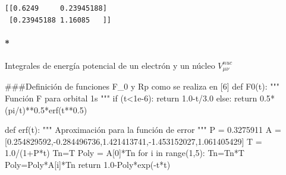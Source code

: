 \documentclass[
  letterpaper,
  DIV=11,
  numbers=noendperiod]{scrreprt}
\let\oldparagraph\paragraph
\renewcommand{\paragraph}[1]{\oldparagraph{#1}\mbox{}}
\newenvironment{Shaded}{\begin{snugshade}}{\end{snugshade}}
\newcommand{\BuiltInTok}[1]{\textcolor[rgb]{0.00,0.23,0.31}{#1}}
\newcommand{\CommentTok}[1]{\textcolor[rgb]{0.37,0.37,0.37}{#1}}
\newcommand{\ControlFlowTok}[1]{\textcolor[rgb]{0.00,0.23,0.31}{#1}}
\newcommand{\DecValTok}[1]{\textcolor[rgb]{0.68,0.00,0.00}{#1}}
\newcommand{\FloatTok}[1]{\textcolor[rgb]{0.68,0.00,0.00}{#1}}
\newcommand{\KeywordTok}[1]{\textcolor[rgb]{0.00,0.23,0.31}{#1}}
\newcommand{\NormalTok}[1]{\textcolor[rgb]{0.00,0.23,0.31}{#1}}
\newcommand{\OperatorTok}[1]{\textcolor[rgb]{0.37,0.37,0.37}{#1}}
\begin{document}
\begin{verbatim}
[[0.6249     0.23945188]
 [0.23945188 1.16085   ]]
\end{verbatim}

\hypertarget{integrales-de-energuxeda-potencial-de-un-electruxf3n-y-un-nuxfacleo-vnuc_mu-nu}{%
\paragraph*{\texorpdfstring{Integrales de energía potencial de un
electrón y un núcleo
\(V^{nuc}_{\mu \nu}\)}{Integrales de energía potencial de un electrón y un núcleo V\^{}\{nuc\}\_\{\textbackslash mu \textbackslash nu\}}}\label{integrales-de-energuxeda-potencial-de-un-electruxf3n-y-un-nuxfacleo-vnuc_mu-nu}}

\begin{Shaded}
\begin{Highlighting}[]
\CommentTok{\#\#\#Definición de funciones F\_0 y Rp como se realiza en [6]}
\KeywordTok{def}\NormalTok{ F0(t):}
    \CommentTok{"""}
\CommentTok{    Función F para orbital 1s}
\CommentTok{    """}
    \ControlFlowTok{if}\NormalTok{ (t}\OperatorTok{\textless{}}\FloatTok{1e{-}6}\NormalTok{):}
        \ControlFlowTok{return} \FloatTok{1.0}\OperatorTok{{-}}\NormalTok{t}\OperatorTok{/}\FloatTok{3.0}
    \ControlFlowTok{else}\NormalTok{:}
        \ControlFlowTok{return} \FloatTok{0.5}\OperatorTok{*}\NormalTok{(pi}\OperatorTok{/}\NormalTok{t)}\OperatorTok{**}\FloatTok{0.5}\OperatorTok{*}\NormalTok{erf(t}\OperatorTok{**}\FloatTok{0.5}\NormalTok{)}
    
\KeywordTok{def}\NormalTok{ erf(t):}
    \CommentTok{"""}
\CommentTok{    Aproximación para la función de error}
\CommentTok{    """}
\NormalTok{    P }\OperatorTok{=} \FloatTok{0.3275911}
\NormalTok{    A }\OperatorTok{=}\NormalTok{ [}\FloatTok{0.254829592}\NormalTok{,}\OperatorTok{{-}}\FloatTok{0.284496736}\NormalTok{,}\FloatTok{1.421413741}\NormalTok{,}\OperatorTok{{-}}\FloatTok{1.453152027}\NormalTok{,}\FloatTok{1.061405429}\NormalTok{]}
\NormalTok{    T }\OperatorTok{=} \FloatTok{1.0}\OperatorTok{/}\NormalTok{(}\DecValTok{1}\OperatorTok{+}\NormalTok{P}\OperatorTok{*}\NormalTok{t)}
\NormalTok{    Tn}\OperatorTok{=}\NormalTok{T}
\NormalTok{    Poly }\OperatorTok{=}\NormalTok{ A[}\DecValTok{0}\NormalTok{]}\OperatorTok{*}\NormalTok{Tn}
    \ControlFlowTok{for}\NormalTok{ i }\KeywordTok{in} \BuiltInTok{range}\NormalTok{(}\DecValTok{1}\NormalTok{,}\DecValTok{5}\NormalTok{):}
\NormalTok{        Tn}\OperatorTok{=}\NormalTok{Tn}\OperatorTok{*}\NormalTok{T}
\NormalTok{        Poly}\OperatorTok{=}\NormalTok{Poly}\OperatorTok{*}\NormalTok{A[i]}\OperatorTok{*}\NormalTok{Tn}
    \ControlFlowTok{return} \FloatTok{1.0}\OperatorTok{{-}}\NormalTok{Poly}\OperatorTok{*}\NormalTok{exp(}\OperatorTok{{-}}\NormalTok{t}\OperatorTok{*}\NormalTok{t)}
\end{Highlighting}
\end{Shaded}
\end{document}
